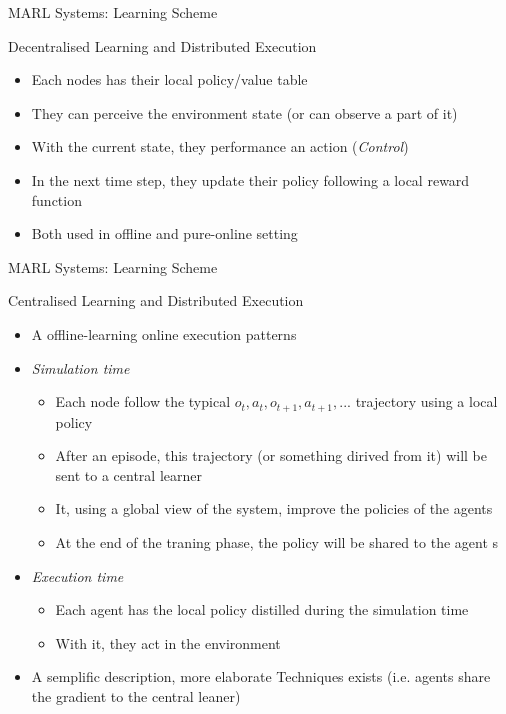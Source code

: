 \documentclass[presentation]{beamer}\mode<presentation>{\usetheme{AMSBolognaFC}}
\begin{document}
\begin{frame}{MARL Systems: Learning Scheme}
	
	\begin{exampleblock}{Decentralised Learning and Distributed Execution}
		\begin{itemize}
			\item Each nodes has their local policy/value table
			\item They can perceive the environment state (or can observe a part of it)
			\item With the current state, they performance an action (\emph{Control})
			\item In the next time step, they update their policy following a local reward function 
			\item Both used in offline and pure-online setting
		\end{itemize}
	\end{exampleblock}
\end{frame}
\begin{frame}{MARL Systems: Learning Scheme}
	
	\begin{exampleblock}{Centralised Learning and Distributed Execution}
		\begin{itemize}
			\item A offline-learning online execution patterns
			\item \emph{Simulation time}
			\begin{itemize}
				\item Each node follow the typical $o_t, a_t, o_{t+1}, a_{t+1},... $ trajectory using a local policy
				\item After an episode, this trajectory (or something dirived from it) will be sent to a central learner
				\item It, using a global view of the system, improve the policies of the agents 
				\item At the end of the traning phase, the policy will be shared to the agent s
			\end{itemize} 
			\item \emph{Execution time}
				\begin{itemize}
					\item Each agent has the local policy distilled during the simulation time
					\item With it, they act in the environment
				\end{itemize}
			\item A semplific description, more elaborate Techniques exists (i.e. agents share the gradient to the central leaner)
		\end{itemize}
	\end{exampleblock}
\end{frame}
\end{document}
